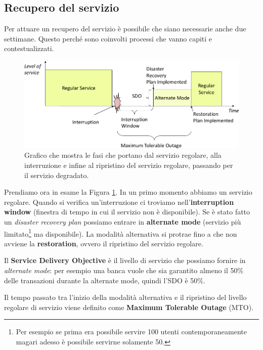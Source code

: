 \subsection{Recupero del servizio}

Per attuare un recupero del servizio è possibile che siano necessarie anche due
settimane.
Questo perché sono coinvolti processi che vanno capiti e contestualizzati.

\begin{figure}[h!]
        \begin{center}
                \includegraphics[scale=0.65]{res/img/recovery-times.png}
        \end{center}
        \caption{Grafico che mostra le fasi che portano dal servizio
        regolare, alla interruzione e infine al ripristino del servizio
        regolare, passando per il servizio degradato.}
        \label{fig:recovery-times}
\end{figure}

Prendiamo ora in esame la Figura \ref{fig:recovery-times}. In un primo 
momento abbiamo un servizio regolare. Quando si verifica un'interruzione
ci troviamo nell'\textbf{in\-ter\-rup\-tion win\-dow} (finestra di tempo 
in cui il servizio non è disponibile). Se è stato fatto un 
\textit{disaster recovery plan} possiamo entrare in 
\textbf{alternate mode} (servizio più limitato\footnote{Per 
esempio se prima era possibile servire 100 utenti contemporaneamente 
magari adesso \`e possibile servirne solamente 50.} ma disponibile).
La modalità alternativa si protrae fino a che non avviene la 
\textbf{restoration},
ovvero il ripristino del servizio regolare.

Il \textbf{Service Delivery Objective} è il livello di servizio che possiamo
fornire in \textit{alternate mode}: per esempio una banca vuole che sia
garantito almeno il 50\% delle transazioni durante la alternate mode, quindi
l'SDO è 50\%.

Il tempo passato tra l'inizio della modalità alternativa e il ripristino
del livello regolare di servizio viene definito come \textbf{Max\-i\-mum
Tol\-er\-a\-ble Out\-age} (MTO).

